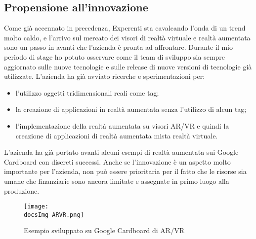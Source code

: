 \subsection{Propensione all'innovazione}
Come gi\`a accennato in precedenza, Experenti sta cavalcando l'onda di un trend molto caldo, e l'arrivo sul mercato dei visori di realt\`a virtuale e realt\`a aumentata sono un passo in avanti che l'azienda \`e pronta ad affrontare. Durante il mio periodo di stage ho potuto osservare come il team di sviluppo sia sempre aggiornato sulle nuove tecnologie e sulle release di nuove versioni di tecnologie gi\`a utilizzate.
L'azienda ha gi\`a avviato ricerche e sperimentazioni per:
\begin{itemize}
	\item l'utilizzo oggetti tridimensionali reali come tag;
	\item la creazione di applicazioni in realt\`a aumentata senza l'utilizzo di alcun tag;
	\item l'implementazione della realt\`a aumentata su visori AR/VR e quindi la creazione di applicazioni di realt\`a aumentata mista realt\`a virtuale.
\end{itemize}
L'azienda ha gi\`a portato avanti alcuni esempi di realt\`a aumentata sui Google Cardboard con discreti successi.
Anche se l'innovazione \`e un aspetto molto importante per l'azienda, non pu\`o essere prioritaria per il fatto che le risorse sia umane che finanziarie sono ancora limitate e assegnate in primo luogo alla produzione.

\begin{figure}[H]
	\centering
	\texttt{[image: \\docsImg ARVR.png]}
	\caption{Esempio sviluppato su Google Cardboard di AR/VR}
	\label{fig:Esempio sviluppato su Google Cardboard di AR/VR}
\end{figure}